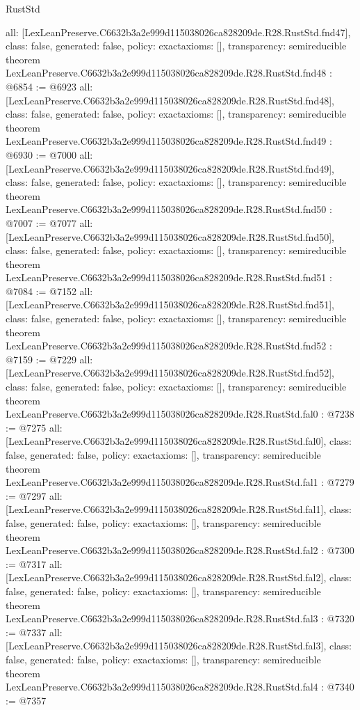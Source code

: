 \begin{lexlean}{RustStd}
\begin{coremodule}
{  all: [LexLeanPreserve.C6632b3a2e999d115038026ca828209de.R28.RustStd.fnd47],
  class: false,
  generated: false,
  policy: exact{axioms: []},
  transparency: semireducible
}
theorem LexLeanPreserve.C6632b3a2e999d115038026ca828209de.R28.RustStd.fnd48 : @6854 := @6923 {
  all: [LexLeanPreserve.C6632b3a2e999d115038026ca828209de.R28.RustStd.fnd48],
  class: false,
  generated: false,
  policy: exact{axioms: []},
  transparency: semireducible
}
theorem LexLeanPreserve.C6632b3a2e999d115038026ca828209de.R28.RustStd.fnd49 : @6930 := @7000 {
  all: [LexLeanPreserve.C6632b3a2e999d115038026ca828209de.R28.RustStd.fnd49],
  class: false,
  generated: false,
  policy: exact{axioms: []},
  transparency: semireducible
}
theorem LexLeanPreserve.C6632b3a2e999d115038026ca828209de.R28.RustStd.fnd50 : @7007 := @7077 {
  all: [LexLeanPreserve.C6632b3a2e999d115038026ca828209de.R28.RustStd.fnd50],
  class: false,
  generated: false,
  policy: exact{axioms: []},
  transparency: semireducible
}
theorem LexLeanPreserve.C6632b3a2e999d115038026ca828209de.R28.RustStd.fnd51 : @7084 := @7152 {
  all: [LexLeanPreserve.C6632b3a2e999d115038026ca828209de.R28.RustStd.fnd51],
  class: false,
  generated: false,
  policy: exact{axioms: []},
  transparency: semireducible
}
theorem LexLeanPreserve.C6632b3a2e999d115038026ca828209de.R28.RustStd.fnd52 : @7159 := @7229 {
  all: [LexLeanPreserve.C6632b3a2e999d115038026ca828209de.R28.RustStd.fnd52],
  class: false,
  generated: false,
  policy: exact{axioms: []},
  transparency: semireducible
}
theorem LexLeanPreserve.C6632b3a2e999d115038026ca828209de.R28.RustStd.fal0 : @7238 := @7275 {
  all: [LexLeanPreserve.C6632b3a2e999d115038026ca828209de.R28.RustStd.fal0],
  class: false,
  generated: false,
  policy: exact{axioms: []},
  transparency: semireducible
}
theorem LexLeanPreserve.C6632b3a2e999d115038026ca828209de.R28.RustStd.fal1 : @7279 := @7297 {
  all: [LexLeanPreserve.C6632b3a2e999d115038026ca828209de.R28.RustStd.fal1],
  class: false,
  generated: false,
  policy: exact{axioms: []},
  transparency: semireducible
}
theorem LexLeanPreserve.C6632b3a2e999d115038026ca828209de.R28.RustStd.fal2 : @7300 := @7317 {
  all: [LexLeanPreserve.C6632b3a2e999d115038026ca828209de.R28.RustStd.fal2],
  class: false,
  generated: false,
  policy: exact{axioms: []},
  transparency: semireducible
}
theorem LexLeanPreserve.C6632b3a2e999d115038026ca828209de.R28.RustStd.fal3 : @7320 := @7337 {
  all: [LexLeanPreserve.C6632b3a2e999d115038026ca828209de.R28.RustStd.fal3],
  class: false,
  generated: false,
  policy: exact{axioms: []},
  transparency: semireducible
}
theorem LexLeanPreserve.C6632b3a2e999d115038026ca828209de.R28.RustStd.fal4 : @7340 := @7357 {
}
\end{coremodule}
\end{lexlean}
